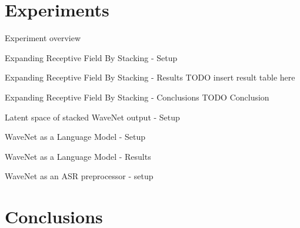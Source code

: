 \documentclass[
  ignorenonframetext,
]{beamer}
\begin{document}
\hypertarget{experiments}{%
\section{Experiments}\label{experiments}}

\begin{frame}{Experiment overview}
\protect\hypertarget{experiment-overview}{}
\end{frame}

\begin{frame}{Expanding Receptive Field By Stacking - Setup}
\protect\hypertarget{expanding-receptive-field-by-stacking---setup}{}
\begin{figure}
\centering
\resizebox{\columnwidth}{!}{

}\end{figure}
\end{frame}

\begin{frame}{Expanding Receptive Field By Stacking - Results}
\protect\hypertarget{expanding-receptive-field-by-stacking---results}{}
TODO insert result table here
\end{frame}

\begin{frame}{Expanding Receptive Field By Stacking - Conclusions}
\protect\hypertarget{expanding-receptive-field-by-stacking---conclusions}{}
TODO Conclusion
\end{frame}

\begin{frame}{Latent space of stacked WaveNet output - Setup}
\protect\hypertarget{latent-space-of-stacked-wavenet-output---setup}{}
\end{frame}

\begin{frame}{WaveNet as a Language Model - Setup}
\protect\hypertarget{wavenet-as-a-language-model---setup}{}
\end{frame}

\begin{frame}{WaveNet as a Language Model - Results}
\protect\hypertarget{wavenet-as-a-language-model---results}{}
\end{frame}

\begin{frame}{WaveNet as an ASR preprocessor - setup}
\protect\hypertarget{wavenet-as-an-asr-preprocessor---setup}{}
\begin{figure}
    \centering
    \begin{subfigure}[b]{0.5\linewidth}
        \resizebox{\columnwidth}{!}{
            
        }
    \end{subfigure}%
    \begin{subfigure}[b]{0.5\linewidth}
        \resizebox{\columnwidth}{!}{
            
        }
    \end{subfigure}
\end{figure}

\end{frame}

\hypertarget{conclusions}{%
\section{Conclusions}\label{conclusions}}
\end{document}

